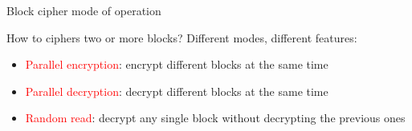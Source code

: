 \begin{frame}{Block cipher mode of operation}

  How to ciphers two or more blocks? Different modes, different features:
  
  \smallskip
  
  \begin{itemize}
    \item \textcolor{red}{Parallel encryption}: encrypt different blocks at the same time
    \item \textcolor{red}{Parallel decryption}: decrypt different blocks at the same time
    \item \textcolor{red}{Random read}: decrypt any single block without decrypting the previous ones
  \end{itemize}

  \smallskip
  

\end{frame}
